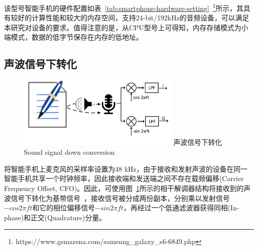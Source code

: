 该型号智能手机的硬件配置如表~\ref{tab:smartphone-hardware-setting}~\footnote{https://www.gsmarena.com/samsung\_galaxy\_s6-6849.php}所示，其具有较好的计算性能和较大的内存空间，支持24-bit/192kHz的音频设备，可以满足本研究对设备的要求。值得注意的是，从CPU型号上可得知，内存存储模式为小端模式，数据的低字节保存在内存的低地址。

\subsection{声波信号下转化}
\begin{figure}[!htp]
  \centering
  \includegraphics[width=0.7\textwidth]{figure/down-conversion.pdf}
  \bicaption
    {声波信号下转化}
    {Sound signal down conversion}
  \label{fig:sound-signal-down-conversion}
\end{figure}
将智能手机上麦克风的采样率设置为48 kHz，由于接收和发射声波的设备在同一智能手机共享一个时钟频率，因此接收端和发送端之间不存在载频偏移(Carrier Frequency Offset, CFO)。因此，可使用图~\ref{fig:sound-signal-down-conversion}所示的相干解调器结构将接收到的声波信号下转化为基带信号~\cite{tse2005fundamentals}，接收信号被分成两份副本，分别乘以发射信号$-cos2\pi ft$和它的相位偏移信号$-sin2\pi ft$，再经过一个低通滤波器获得同相(In-phase)和正交(Quadrature)分量。

